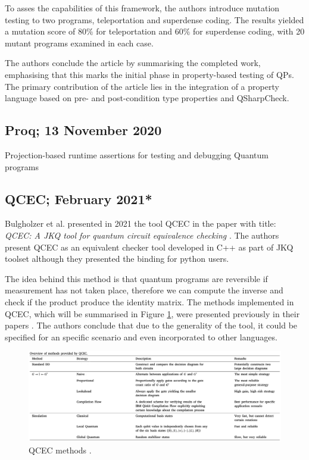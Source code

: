 \begin{itemize}
To asses the capabilities of this framework, the authors introduce mutation testing to two programs, teleportation and superdense coding. The results yielded a mutation score of $80\%$ for teleportation and $60\%$ for superdense coding, with 20 mutant programs examined in each case.\newline

The authors conclude the article by summarising the completed work, emphasising that this marks the initial phase in property-based testing of QPs. The primary contribution of the article lies in the integration of a property language based on pre- and post-condition type properties and QSharpCheck.

\vspace{15pt}
\subsection{Proq; 13 November 2020}

Projection-based runtime assertions for testing and debugging Quantum programs \cite{li2020projection}

\vspace{15pt}
\subsection{QCEC; February 2021*}

Bulgholzer et al. presented in 2021 the tool QCEC in the paper with title: \textit{QCEC: A JKQ tool for quantum circuit equivalence checking} \cite{burgholzer2021qcec}. The authors present QCEC as an equivalent checker tool developed in C++ as part of JKQ toolset although they presented the binding for python users.\newline

The idea behind this method is that quantum programs are reversible if measurement has not taken place, therefore we can compute the inverse and check if the product produce the identity matrix. The methods implemented in QCEC, which will be summarised in Figure \ref{Fig:QCEC}, were presented previously in their papers \cite{burgholzer2020improved}\cite{burgholzer2020power}\cite{niemann2015qmdds}\cite{burgholzer2020verifying}\cite{burgholzer2021random}. The authors conclude that due to the generality of the tool, it could be specified for an specific scenario and even incorporated to other languages.

\begin{figure}[H]
        \centering
        \includegraphics[width=\textwidth]{TFM/photos/QCEC.png}
        \caption{QCEC methods \cite{burgholzer2021qcec}.} 
        \label{Fig:QCEC}
\end{figure}


\end{itemize}
